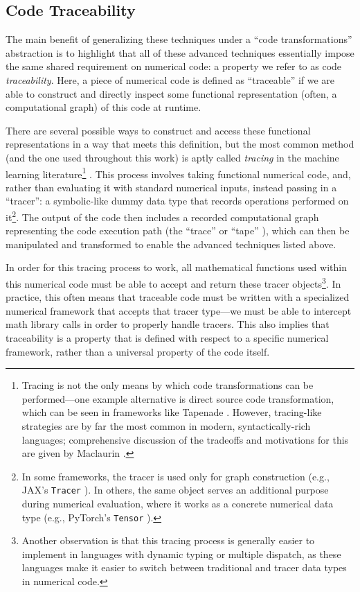 
\subsection{Code Traceability}

The main benefit of generalizing these techniques under a ``code transformations'' abstraction is to highlight that all of these advanced techniques essentially impose the same shared requirement on numerical code: a property we refer to as code \emph{traceability}. Here, a piece of numerical code is defined as ``traceable'' if we are able to construct and directly inspect some functional representation (often, a computational graph) of this code at runtime.

There are several possible ways to construct and access these functional representations in a way that meets this definition, but the most common method (and the one used throughout this work) is aptly called \emph{tracing} in the machine learning literature\footnote{Tracing is not the only means by which code transformations can be performed—one example alternative is direct source code transformation, which can be seen in frameworks like Tapenade \cite{tapenade}. However, tracing-like strategies are by far the most common in modern, syntactically-rich languages; comprehensive discussion of the tradeoffs and motivations for this are given by Maclaurin \cite{maclaurin_modeling_2016}.} \cite{jax, frostig_compiling_2018, baydin_automatic_2018}. This process involves taking functional numerical code, and, rather than evaluating it with standard numerical inputs, instead passing in a ``tracer'': a symbolic-like dummy data type that records operations performed on it\footnote{In some frameworks, the tracer is used only for graph construction (e.g., JAX's \texttt{Tracer} \cite{jax}). In others, the same object serves an additional purpose during numerical evaluation, where it works as a concrete numerical data type (e.g., PyTorch's \texttt{Tensor} \cite{paszke_pytorch_2019}).}. The output of the code then includes a recorded computational graph representing the code execution path (the ``trace'' or ``tape'' \cite{paszke_pytorch_2019}), which can then be manipulated and transformed to enable the advanced techniques listed above.

In order for this tracing process to work, all mathematical functions used within this numerical code must be able to accept and return these tracer objects\footnote{Another observation is that this tracing process is generally easier to implement in languages with dynamic typing or multiple dispatch, as these languages make it easier to switch between traditional and tracer data types in numerical code.}. In practice, this often means that traceable code must be written with a specialized numerical framework that accepts that tracer type—we must be able to intercept math library calls in order to properly handle tracers. This also implies that traceability is a property that is defined with respect to a specific numerical framework, rather than a universal property of the code itself.

